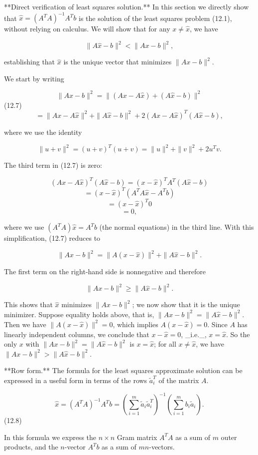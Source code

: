 

**Direct verification of least squares solution.** In this section we directly show that \(\hat{x}=(A^{T}A)^{-1}A^{T}b\) is the solution of the least squares problem (12.1), without relying on calculus. We will show that for any \(x\neq\hat{x}\), we have

\[\|A\hat{x}-b\|^{2}<\|Ax-b\|^{2},\]

establishing that \(\hat{x}\) is the unique vector that minimizes \(\|Ax-b\|^{2}\).

We start by writing

\[\|Ax-b\|^{2} = \|(Ax-A\hat{x})+(A\hat{x}-b)\|^{2}\] (12.7) \[= \|Ax-A\hat{x}\|^{2}+\|A\hat{x}-b\|^{2}+2(Ax-A\hat{x})^{T}(A\hat{ x}-b),\]

where we use the identity

\[\|u+v\|^{2}=(u+v)^{T}(u+v)=\|u\|^{2}+\|v\|^{2}+2u^{T}v.\]

The third term in (12.7) is zero:

\[(Ax-A\hat{x})^{T}(A\hat{x}-b) = (x-\hat{x})^{T}A^{T}(A\hat{x}-b)\] \[= (x-\hat{x})^{T}(A^{T}A\hat{x}-A^{T}b)\] \[= (x-\hat{x})^{T}0\] \[= 0,\]

where we use \((A^{T}A)\hat{x}=A^{T}b\) (the normal equations) in the third line. With this simplification, (12.7) reduces to

\[\|Ax-b\|^{2}=\|A(x-\hat{x})\|^{2}+\|A\hat{x}-b\|^{2}.\]

The first term on the right-hand side is nonnegative and therefore

\[\|Ax-b\|^{2}\geq\|A\hat{x}-b\|^{2}.\]

This shows that \(\hat{x}\) minimizes \(\|Ax-b\|^{2}\); we now show that it is the unique minimizer. Suppose equality holds above, that is, \(\|Ax-b\|^{2}=\|A\hat{x}-b\|^{2}\). Then we have \(\|A(x-\hat{x})\|^{2}=0\), which implies \(A(x-\hat{x})=0\). Since \(A\) has linearly independent columns, we conclude that \(x-\hat{x}=0\), _i.e._, \(x=\hat{x}\). So the only \(x\) with \(\|Ax-b\|^{2}=\|A\hat{x}-b\|^{2}\) is \(x=\hat{x}\); for all \(x\neq\hat{x}\), we have \(\|Ax-b\|^{2}>\|A\hat{x}-b\|^{2}\).

**Row form.** The formula for the least squares approximate solution can be expressed in a useful form in terms of the rows \(\tilde{a}_{i}^{T}\) of the matrix \(A\).

\[\hat{x}=(A^{T}A)^{-1}A^{T}b=\left(\sum_{i=1}^{m}\tilde{a}_{i}\tilde{a}_{i}^{T} \right)^{-1}\left(\sum_{i=1}^{m}b_{i}\tilde{a}_{i}\right).\] (12.8)

In this formula we express the \(n\times n\) Gram matrix \(A^{T}A\) as a sum of \(m\) outer products, and the \(n\)-vector \(A^{T}b\) as a sum of \(m\)\(n\)-vectors.

